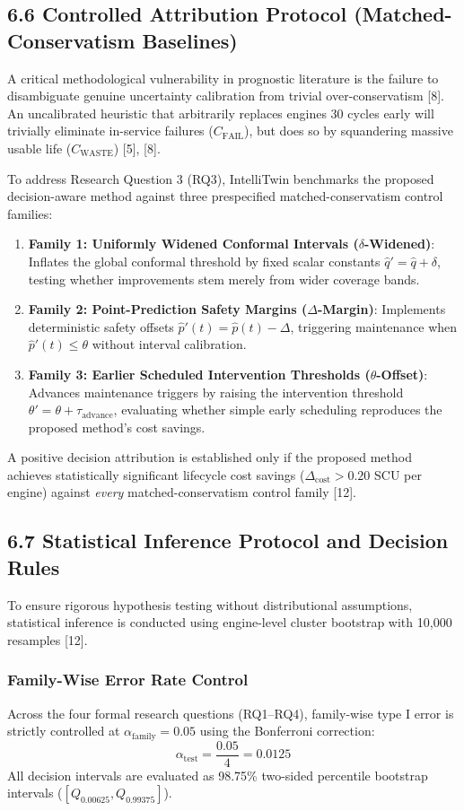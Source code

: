 \documentclass[12pt,a4paper]{article}
\begin{document}
\subsection*{6.6 Controlled Attribution Protocol (Matched-Conservatism Baselines)}
A critical methodological vulnerability in prognostic literature is the failure to disambiguate genuine uncertainty calibration from trivial over-conservatism [8]. An uncalibrated heuristic that arbitrarily replaces engines 30 cycles early will trivially eliminate in-service failures ($C_{\text{FAIL}}$), but does so by squandering massive usable life ($C_{\text{WASTE}}$) [5], [8].

To address Research Question 3 (RQ3), IntelliTwin benchmarks the proposed decision-aware method against three prespecified matched-conservatism control families:
\begin{enumerate}
    \item \textbf{Family 1: Uniformly Widened Conformal Intervals ($\delta$-Widened)}: Inflates the global conformal threshold by fixed scalar constants $\hat{q}' = \hat{q} + \delta$, testing whether improvements stem merely from wider coverage bands.
    \item \textbf{Family 2: Point-Prediction Safety Margins ($\Delta$-Margin)}: Implements deterministic safety offsets $\hat{p}'(t) = \hat{p}(t) - \Delta$, triggering maintenance when $\hat{p}'(t) \le \theta$ without interval calibration.
    \item \textbf{Family 3: Earlier Scheduled Intervention Thresholds ($\theta$-Offset)}: Advances maintenance triggers by raising the intervention threshold $\theta' = \theta + \tau_{\text{advance}}$, evaluating whether simple early scheduling reproduces the proposed method's cost savings.
\end{enumerate}
A positive decision attribution is established only if the proposed method achieves statistically significant lifecycle cost savings ($\Delta_{\text{cost}} > 0.20$ SCU per engine) against \textit{every} matched-conservatism control family [12].

\subsection*{6.7 Statistical Inference Protocol and Decision Rules}
To ensure rigorous hypothesis testing without distributional assumptions, statistical inference is conducted using engine-level cluster bootstrap with 10,000 resamples [12]. 

\subsubsection*{Family-Wise Error Rate Control}
Across the four formal research questions (RQ1--RQ4), family-wise type I error is strictly controlled at $\alpha_{\text{family}} = 0.05$ using the Bonferroni correction:
\begin{equation}
\alpha_{\text{test}} = \frac{0.05}{4} = 0.0125
\end{equation}
All decision intervals are evaluated as 98.75\% two-sided percentile bootstrap intervals ($[Q_{0.00625}, Q_{0.99375}]$).
\end{document}
